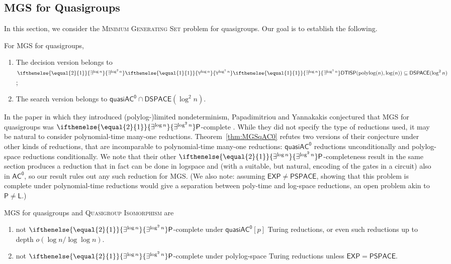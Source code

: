 \documentclass{theoretics}
\newcommand{\algprobm}[1]{\textsc{#1}\xspace}
\newcommand{\betacc}[1]{\ifthenelse{\equal{#1}{1}}{\exists^{\log n}}{\exists^{\log^{#1}n}}} %
\newcommand{\alphacc}[1]{\ifthenelse{\equal{#1}{1}}{\forall^{\log n}}{\forall^{\log^{#1}n}}} %
\newcommand*{\ComplexityClass}[1]{\ensuremath{\mathsf{#1}}\xspace}
\renewcommand{\P}{\ComplexityClass{P}}
\newcommand*{\EXP}{\ComplexityClass{EXP}}
\newcommand{\DTISP}{\ComplexityClass{DTISP}}
\newcommand{\DTISPpll}{\ensuremath{\DTISP(\mathrm{polylog}(n),\mathrm{log}(n))}\xspace}
\newcommand*{\LogSpace}{\ComplexityClass{L}}
\newcommand*{\PSPACE}{\ComplexityClass{PSPACE}}
\newcommand{\ACz}{\ComplexityClass{AC^0}}
\newcommand{\qACz}{\ComplexityClass{quasiAC^0}}
\begin{document}
\subsection{\algprobm{MGS} for Quasigroups}
In this section, we consider the \algprobm{Minimum Generating Set} problem for quasigroups. Our goal is to establish the following.

\begin{theorem} \label{thm:MGSqAC0}
For \algprobm{MGS} for quasigroups, 
\renewcommand{\theenumi}{\alph{enumi}}
\begin{enumerate}
\item \label{thm:MGSqAC0:NTIME} The decision version belongs to $\betacc{2}\alphacc{1}\betacc{1}\DTISPpll \subseteq \mathsf{DSPACE}(\log^2 n)$;


\item \label{thm:MGSqAC0:search} The search version belongs to $\qACz \cap \mathsf{DSPACE}(\log^2 n)$.
\end{enumerate}
\end{theorem}

In the paper in which they introduced (polylog-)limited nondeterminism, Papadimitriou and Yannakakis conjectured that MGS for quasigroups was $\betacc{2}\P$-complete \cite[after Thm.~7]{PY}. While they did not specify the type of reductions used, it may be natural to consider polynomial-time many-one reductions. Theorem~\ref{thm:MGSqAC0} refutes two versions of their conjecture under other kinds of reductions, that are incomparable to polynomial-time many-one reductions: $\qACz$ reductions unconditionally and polylog-space reductions conditionally. We note that their other $\betacc{2}\P$-completeness result in the same section produces a reduction that in fact can be done in logspace and (with a suitable, but natural, encoding of the gates in a circuit) also in $\ACz$, so our result rules out any such reduction for \algprobm{MGS}. 
(We also note: assuming $\EXP \neq \PSPACE$, showing that this problem is complete under polynomial-time reductions would give a separation between poly-time and log-space reductions, an open problem akin to $\P \neq \LogSpace$.) 


\renewcommand{\theenumi}{\alph{enumi}}
\begin{corollary}
\algprobm{MGS} for quasigroups and \algprobm{Quasigroup Isomorphism} are 
\begin{enumerate}
\item not $\betacc{2} \P$-complete under $\qACz[p]$ Turing reductions, or even such reductions up to depth $o(\log n / \log \log n)$.

\item not $\betacc{2} \P$-complete under polylog-space Turing reductions unless $\mathsf{EXP} = \mathsf{PSPACE}$.
\end{enumerate}
\end{corollary}
\end{document}
